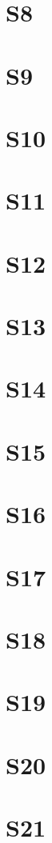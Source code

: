 \documentclass[12pt,a4paper]{report} %
\begin{document}
\section{S8} \lipsum[9]
\section{S9} \lipsum[10]
\section{S10} \lipsum[11]
\section{S11} \lipsum[12]
\section{S12} \lipsum[13]
\section{S13} \lipsum[14]
\section{S14} \lipsum[15]
\section{S15} \lipsum[16]
\section{S16} \lipsum[17]
\section{S17} \lipsum[18]
\section{S18} \lipsum[19]
\section{S19} \lipsum[20]
\section{S20} \lipsum[21]
\section{S21} \lipsum[22]
\end{document}

